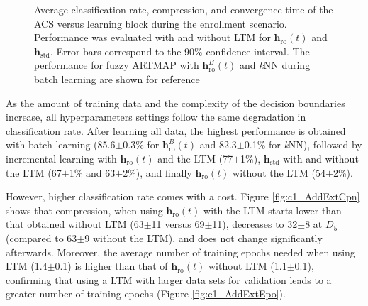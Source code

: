 \begin{figure}[t]
  \centering
  \caption{Average classification rate, compression, and convergence time of the ACS versus learning block during the enrollment scenario. Performance was evaluated with and without LTM for $\textbf{h}_\text{ro}(t)$ and $\textbf{h}_\text{std}$. Error bars correspond to the 90\% confidence interval. The performance for fuzzy ARTMAP with $\textbf{h}_\text{ro}^B(t)$ and \textit{k}NN during batch learning are shown for reference}
	\label{fig:c1_AddExt}
\end{figure}

As the amount of training data and the complexity of the decision boundaries increase, all hyperparameters settings follow the same degradation in classification rate. After learning all data, the highest performance is obtained with batch learning (85.6$\pm$0.3\% for $\textbf{h}_\text{ro}^B(t)$ and 82.3$\pm$0.1\% for \textit{k}NN), followed by incremental learning with $\textbf{h}_\text{ro}(t)$ and the LTM (77$\pm$1\%), $\textbf{h}_\text{std}$ with and without the LTM (67$\pm$1\% and 63$\pm$2\%), and finally $\textbf{h}_\text{ro}(t)$ without the LTM (54$\pm$2\%).

However, higher classification rate comes with a cost. Figure \ref{fig:c1_AddExtCpn} shows that compression, when using $\textbf{h}_\text{ro}(t)$ with the LTM starts lower than that obtained without LTM (63$\pm$11 versus 69$\pm$11), decreases to 32$\pm$8 at $D_5$ (compared to 63$\pm$9 without the LTM), and does not change significantly afterwards. Moreover, the average number of training epochs needed when using LTM (1.4$\pm$0.1) is higher than that of $\textbf{h}_\text{ro}(t)$ without LTM (1.1$\pm$0.1), confirming that using a LTM with larger data sets for validation leads to a greater number of training epochs (Figure \ref{fig:c1_AddExtEpo}).

